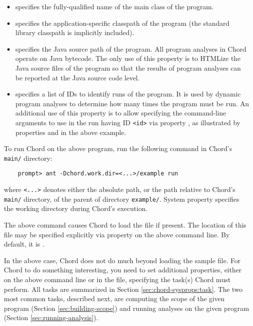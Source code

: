 \begin{itemize}
\item
{} specifies the fully-qualified name of the main class of the
program.
\item
{} specifies the application-specific classpath of the program
(the standard library classpath is implicitly included).
\item
{} specifies the Java source path of the program.
All program analyses in Chord operate on Java bytecode.
The only use of this property is to HTMLize the Java source files of the program so that the
results of program analyses can be reported at the Java source code level.
\item
{} specifies a list of IDs to identify runs of the program.
It is used by dynamic program analyses to determine how many times the program must be run.
An additional use of this property is to allow specifying the command-line arguments to use
in the run having ID {\tt <id>} via property , as illustrated by
properties  and  in the above example.
\end{itemize}

To run Chord on the above program, run the following command in Chord's {\tt main/} directory:

\begin{verbatim}
    prompt> ant -Dchord.work.dir=<...>/example run
\end{verbatim}

\noindent where {\tt <...>} denotes either the absolute path, or the path relative to Chord's {\tt main/} directory,
of the parent of directory {\tt example/}.
System property  specifies the working directory during Chord's execution.

The above command causes Chord to load the  file if present.
The location of this file may be specified explicitly via property
 on the above command line.
By default, it is .

In the above case, Chord does not do much beyond loading the sample  file.
For Chord to do something interesting, you need to set additional properties, either
on the above command line or in the  file, specifying the task(s)
Chord must perform.
All tasks are summarized in Section \ref{sec:chord-sysprops:task}.
The two most common tasks, described next, are computing the scope of the given program (Section \ref{sec:building-scope})
and running analyses on the given program (Section \ref{sec:running-analysis}).

